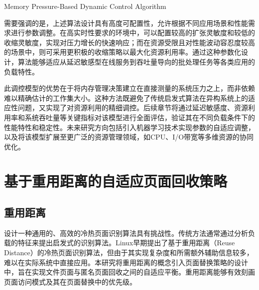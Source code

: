 \begin{algorithm}[htbp]
  \caption{Memory Pressure-Based Dynamic Control Algorithm}
  \label{alg:control}
\end{algorithm}


需要强调的是，上述算法设计具有高度可配置性，允许根据不同应用场景和性能需求进行参数调整。在高实时性要求的环境中，可以配置较高的扩张灵敏度和较低的收缩灵敏度，实现对压力增长的快速响应；而在资源受限且对性能波动容忍度较高的场景中，则可采用更积极的收缩策略以最大化资源利用率。通过这种参数化设计，算法能够适应从延迟敏感型在线服务到吞吐量导向的批处理任务等各类应用的负载特性。

此调控模型的优势在于将内存管理决策建立在直接测量的系统压力之上，而非依赖难以精确估计的工作集大小。这种方法既避免了传统启发式算法在异构系统上的适应性问题，又实现了对资源利用的精细调控。后续章节将通过延迟敏感度、资源利用率和系统吞吐量等关键指标对该模型进行全面评估，验证其在不同负载条件下的性能特性和稳定性。未来研究方向包括引入机器学习技术实现参数的自适应调整，以及将该模型扩展至更广泛的资源管理领域，如CPU、I/O带宽等多维资源的协同优化。

\section{基于重用距离的自适应页面回收策略}
\label{sec:基于重用距离的冷热页面优化}

\subsection{重用距离}

设计一种通用的、高效的冷热页面识别算法具有挑战性。传统方法通常通过分析负载的特征来提出启发式的识别算法。Linux早期提出了基于重用距离（Reuse Distance）的冷热页面识别算法，但由于其实现复杂度和所需额外辅助信息较多，难以在实际系统中直接应用。本研究将重用距离的概念引入页面替换策略的设计中，旨在实现文件页面与匿名页面回收之间的自适应平衡。重用距离能够有效刻画页面访问模式及其在页面替换中的优先级。

